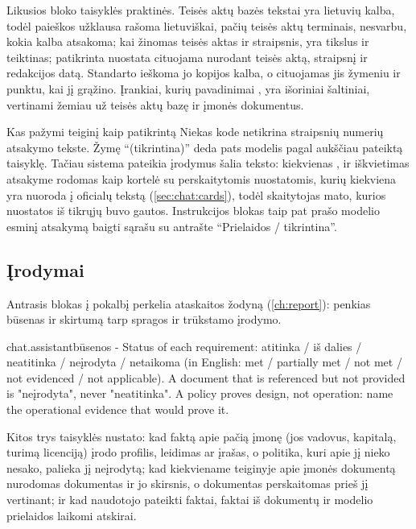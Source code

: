 Likusios bloko taisyklės praktinės. Teisės aktų bazės tekstai yra lietuvių kalba, todėl paieškos
užklausa rašoma lietuviškai, pačių teisės aktų terminais, nesvarbu, kokia kalba atsakoma; kai
žinomas teisės aktas ir straipsnis,  yra tikslus ir teiktinas;
patikrinta nuostata cituojama nurodant teisės aktą, straipsnį ir redakcijos datą. Standarto
ieškoma jo kopijos kalba, o cituojamas jis žymeniu ir punktu, kai  jį
grąžino. Įrankiai, kurių pavadinimai , yra išoriniai šaltiniai, vertinami žemiau už
teisės aktų bazę ir įmonės dokumentus.

\begin{aibox}{Kas pažymi teiginį kaip patikrintą}
Niekas kode netikrina straipsnių numerių atsakymo tekste. Žymę \enquote{(tikrintina)} deda pats
modelis pagal aukščiau pateiktą taisyklę. Tačiau sistema pateikia įrodymus šalia teksto: kiekvienas
,  ir  iškvietimas atsakyme
rodomas kaip kortelė su perskaitytomis nuostatomis, kurių kiekviena yra nuoroda į oficialų tekstą
(\cref{sec:chat:cards}), todėl skaitytojas mato, kurios nuostatos iš tikrųjų buvo gautos.
Instrukcijos  blokas taip pat prašo modelio esminį atsakymą baigti sąrašu su
antrašte \enquote{Prielaidos / tikrintina}.
\end{aibox}

\subsection{Įrodymai}

Antrasis blokas į pokalbį perkelia ataskaitos žodyną (\cref{ch:report}): penkias būsenas ir
skirtumą tarp spragos ir trūkstamo įrodymo.

\begin{promptexcerpt}{chat.assistant}{būsenos}
- Status of each requirement: atitinka / iš dalies / neatitinka / neįrodyta / netaikoma (in English: met / partially met / not met / not evidenced / not applicable). A document that is referenced but not provided is "neįrodyta", never "neatitinka". A policy proves design, not operation: name the operational evidence that would prove it.
\end{promptexcerpt}

Kitos trys taisyklės nustato: kad faktą apie pačią įmonę (jos vadovus, kapitalą, turimą
licenciją) įrodo profilis, leidimas ar įrašas, o politika, kuri apie jį nieko nesako, palieka jį
neįrodytą; kad kiekviename teiginyje apie įmonės dokumentą nurodomas dokumentas ir jo skirsnis,
o dokumentas perskaitomas prieš jį vertinant; ir kad naudotojo pateikti faktai, faktai iš
dokumentų ir modelio prielaidos laikomi atskirai.

